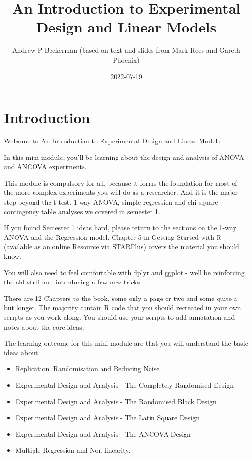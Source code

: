 \documentclass[
]{book}
\title{An Introduction to Experimental Design and Linear Models}
\author{Andrew P Beckerman (based on text and slides from Mark Rees and Gareth Phoenix)}
\date{2022-07-19}
\providecommand{\tightlist}{%
  \setlength{\itemsep}{0pt}\setlength{\parskip}{0pt}}
\begin{document}
\maketitle

{
\setcounter{tocdepth}{1}
\tableofcontents
}
\hypertarget{introduction}{%
\chapter{Introduction}\label{introduction}}

Welcome to An Introduction to Experimental Design and Linear Models

In this mini-module, you'll be learning about the design and analysis of ANOVA and ANCOVA experiments.

This module is compulsory for all, because it forms the foundation for most of the more complex experiments you will do as a researcher. And it is the major step beyond the t-test, 1-way ANOVA, simple regression and chi-square contingency table analyses we covered in semester 1.

If you found Semester 1 ideas hard, please return to the sections on the 1-way ANOVA and the Regression model. Chapter 5 in Getting Started with R (available as an online Resource via STARPlus) covers the material you should know.

You will also need to feel comfortable with dplyr and ggplot - well be reinforcing the old stuff and introducing a few new tricks.

There are 12 Chapters to the book, some only a page or two and some quite a but longer. The majority contain R code that you should recreated in your own scripts as you work along. You should use your scripts to add annotation and notes about the core ideas.

The learning outcome for this mini-module are that you will understand the basic ideas about

\begin{itemize}
\tightlist
\item
  Replication, Randomisation and Reducing Noise
\item
  Experimental Design and Analysis - The Completely Randomised Design
\item
  Experimental Design and Analysis - The Randomised Block Design
\item
  Experimental Design and Analysis - The Latin Square Design
\item
  Experimental Design and Analysis - The ANCOVA Design
\item
  Multiple Regression and Non-linearity.
\end{itemize}
\end{document}
